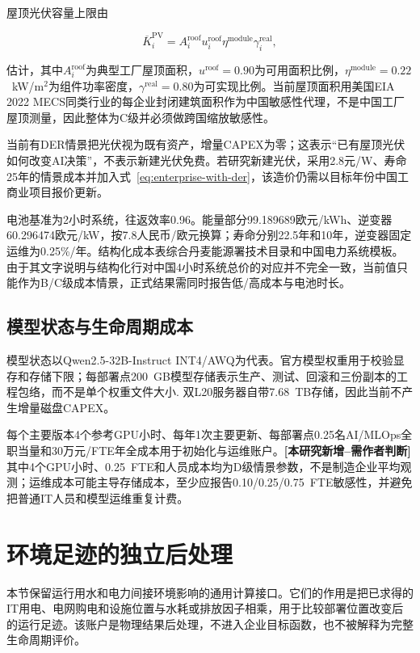 \documentclass[preprint]{elsarticle}
\newcommand{\newwork}{\textcolor{orange!80!black}{\textbf{[本研究新增--需作者判断]}}}
\begin{document}
屋顶光伏容量上限由

\begin{equation}
 \overline K_{i}^{\mathrm{PV}}=
 A_i^{\mathrm{roof}}u_i^{\mathrm{roof}}
 \eta^{\mathrm{module}}\gamma_i^{\mathrm{real}},
 \label{eq:pv-rooftop-capacity}
\end{equation}

估计，其中$A_i^{\mathrm{roof}}$为典型工厂屋顶面积，$u^{\mathrm{roof}}=0.90$为可用面积比例，$\eta^{\mathrm{module}}=0.22$~kW/m$^2$为组件功率密度，$\gamma^{\mathrm{real}}=0.80$为可实现比例。当前屋顶面积用美国EIA 2022 MECS同类行业的每企业封闭建筑面积作为中国敏感性代理\cite{mecs2022}，不是中国工厂屋顶测量，因此整体为C级并必须做跨国缩放敏感性。

当前有DER情景把光伏视为既有资产，增量CAPEX为零；这表示“已有屋顶光伏如何改变AI决策”，不表示新建光伏免费。若研究新建光伏，采用2.8元/W、寿命25年的情景成本并加入式~\eqref{eq:enterprise-with-der}，该造价仍需以目标年份中国工商业项目报价更新。

电池基准为2小时系统，往返效率0.96。能量部分99.189689欧元/kWh、逆变器60.296474欧元/kW，按7.8人民币/欧元换算；寿命分别22.5年和10年，逆变器固定运维为0.25\%/年。结构化成本表综合丹麦能源署技术目录和中国电力系统模板\cite{deaStorage}。由于其文字说明与结构化行对中国4小时系统总价的对应并不完全一致，当前值只能作为B/C级成本情景，正式结果需同时报告低/高成本与电池时长。

\subsection{模型状态与生命周期成本}

模型状态以Qwen2.5-32B-Instruct INT4/AWQ为代表。官方模型权重用于校验显存和存储下限；每部署点200~GB模型存储表示生产、测试、回滚和三份副本的工程包络，而不是单个权重文件大小\cite{qwen25}. 双L20服务器自带7.68~TB存储，因此当前不产生增量磁盘CAPEX。

每个主要版本4个参考GPU小时、每年1次主要更新、每部署点0.25名AI/MLOps全职当量和30万元/FTE年全成本用于初始化与运维账户。\newwork 其中4个GPU小时、0.25~FTE和人员成本均为D级情景参数，不是制造企业平均观测；运维成本可能主导存储成本，至少应报告0.10/0.25/0.75~FTE敏感性，并避免把普通IT人员和模型运维重复计费。

\section{环境足迹的独立后处理}

本节保留运行用水和电力间接环境影响的通用计算接口。它们的作用是把已求得的IT用电、电网购电和设施位置与水耗或排放因子相乘，用于比较部署位置改变后的运行足迹。该账户是物理结果后处理，不进入企业目标函数，也不被解释为完整生命周期评价\cite{xiao2025}。
\end{document}
